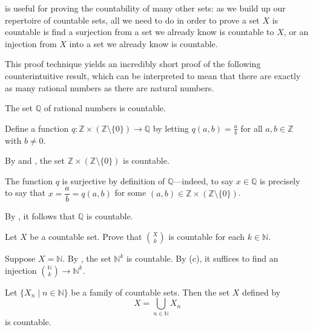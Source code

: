  is useful for proving the countability of many other sets: as we build up our repertoire of countable sets, all we need to do in order to prove a set $X$ is countable is find a surjection from a set we already know is countable to $X$, or an injection from $X$ into a set we already know is countable.

This proof technique yields an incredibly short proof of the following counterintuitive result, which can be interpreted to mean that there are exactly as many rational numbers as there are natural numbers.

\begin{theorem}
\label{thmRationalsAreCountable}
The set $\mathbb{Q}$ of rational numbers is countable.
\end{theorem}

\begin{cproof}
Define a function $q : \mathbb{Z} \times (\mathbb{Z} \setminus \{ 0 \}) \to \mathbb{Q}$ by letting $q(a,b) = \frac{a}{b}$ for all $a,b \in \mathbb{Z}$ with $b \ne 0$.

By  and , the set $\mathbb{Z} \times (\mathbb{Z} \setminus \{ 0 \})$ is countable.

The function $q$ is surjective by definition of $\mathbb{Q}$---indeed, to say $x \in \mathbb{Q}$ is precisely to say that $x = \dfrac{a}{b} = q(a,b)$ for some $(a,b) \in \mathbb{Z} \times (\mathbb{Z} \setminus \{ 0 \})$.

By , it follows that $\mathbb{Q}$ is countable.
\end{cproof}

\begin{exercise} \label{exFiniteSubsetsCountableFixedSize}
Let $X$ be a countable set. Prove that $\binom{X}{k}$ is countable for each $k \in \mathbb{N}$.
\begin{backhint}
Suppose $X=\mathbb{N}$. By , the set $\mathbb{N}^k$ is countable. By (c), it suffices to find an injection $\binom{\mathbb{N}}{k} \to \mathbb{N}^k$.
\end{backhint}
\end{exercise}

\begin{theorem}
\label{thmCountableUnionOfCountableSetIsCountable}
Let $\{ X_n \mid n \in \mathbb{N} \}$ be a family of countable sets. Then the set $X$ defined by
\[ X = \bigcup_{n \in \mathbb{N}} X_n \]
is countable.
\end{theorem}

